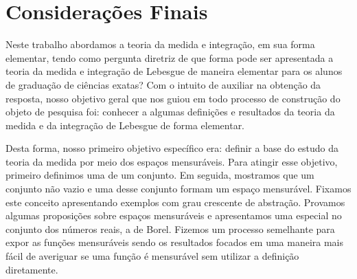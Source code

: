 




\chapter{Considerações Finais}
	Neste trabalho abordamos a teoria da medida e integração, em sua forma elementar, tendo como pergunta diretriz de que forma pode ser apresentada a teoria da medida e integração de Lebesgue de maneira elementar para os alunos de graduação de ciências exatas?
	Com o intuito de auxiliar na obtenção da resposta, nosso objetivo geral que nos guiou em todo processo de construção do objeto de pesquisa foi: 
	conhecer a algumas definições e resultados da teoria da medida e da integração de Lebesgue de forma elementar.
	
	Desta forma, nosso primeiro objetivo específico era: definir a base do estudo da teoria da medida por meio dos espaços mensuráveis.
	Para atingir esse objetivo, primeiro definimos  uma \sigal de um conjunto.
	Em seguida, mostramos que um conjunto não vazio e uma \sigal desse conjunto formam um espaço mensurável.
	Fixamos este conceito apresentando exemplos com grau crescente de abstração.
	Provamos algumas proposições sobre espaços mensuráveis e apresentamos uma \sigal especial no conjunto dos números reais, a \sigal de Borel.
	Fizemos um processo semelhante para expor as funções mensuráveis sendo os resultados focados em uma maneira mais fácil de averiguar se uma função é mensurável sem utilizar a definição diretamente.
	
